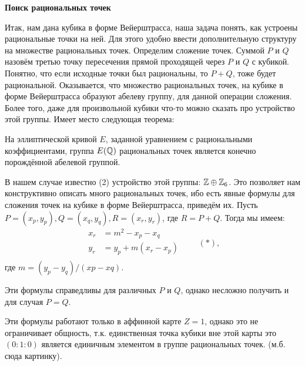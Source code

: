 \begin{center}
    {\normalfont\fontsize{13}{13}\textbf{Поиск рациональных точек}}
\end{center}

Итак, нам дана кубика в форме Вейерштрасса, наша задача понять, как устроены
рациональные точки на ней. Для этого удобно ввести дополнительную структуру на
множестве рациональных точек. Определим сложение точек.  Суммой \(P\) и \(Q\)
назовём третью точку пересечения прямой проходящей через \(P\) и \(Q\) с
кубикой. Понятно, что если исходные точки был рациональны, то \(P + Q\), тоже
будет рациональной.  Оказывается, что множество рациональных точек, на кубике
в форме Вейерштрасса образуют абелеву группу, для данной операции сложения.
Более того, даже для произвольной кубики что-то можно сказать про устройство
этой группы. Имеет место следующая теорема:

\begin{theoremf}
    На эллиптической кривой \(E\), заданной уравнением с рациональными
    коэффициентами, группа \(E(\mathbb{Q})\) рациональных точек является
    конечно порождённой абелевой группой.
\end{theoremf}

В нашем случае известно (2) устройство этой группы:
\(\mathbb{Z} \oplus \mathbb{Z}_6\). Это позволяет нам конструктивно описать много
рациональных точек, ибо есть явные формулы для сложения точек на кубике в форме
Вейерштрасса, приведём их. Пусть \(P = (x_{p}, y_{p}), Q = (x_{q}, y_{q}), R =
(x_{r}, y_{r})\), где \(R = P + Q\). Тогда мы имеем:
\[
\begin{aligned}
    x_r &= m^2 - x_p - x_q \\
    y_r &= y_p + m(x_r - x_p) \\
\end{aligned} \qquad (*)
,\] 
где \(m = (y_{p} - y_{q}) / (x{p} - x{q})\).


\begin{remark}
    Эти формулы справедливы для различных \(P\) и \(Q\), однако несложно получить и
    для случая \(P = Q\).
\end{remark}

\begin{remark}
    Эти формулы работают только в аффинной карте \(Z = 1\), однако это не
    ограничивает общность, т.к. единственная точка кубики вне этой карты это
    \((0 : 1 : 0)\) является единичным элементом в группе рациональных точек. (м.б.
    сюда картинку).
\end{remark}

